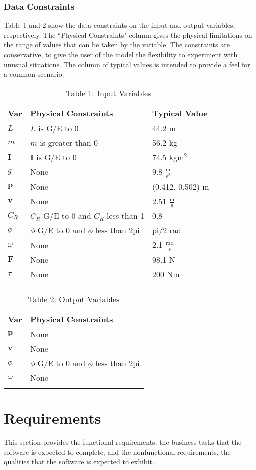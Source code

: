 \documentclass[12pt]{article}
\begin{document}
\subsubsection{Data Constraints}
\label{Sec:DC}
Table 1 and 2 show the data constraints on the input and output variables, respectively. The ``Physical Constraints" column gives the physical limitations on the range of values that can be taken by the variable. The constraints are conservative, to give the user of the model the flexibility to experiment with unusual situations. The column of typical values is intended to provide a feel for a common scenario.
\begin{longtable}{l l l}
\toprule
Var & Physical Constraints & Typical Value
\\
\midrule
$L$ & $L$ is G/E to 0 & 44.2 m
\\
$m$ & $m$ is greater than 0 & 56.2 kg
\\
$\mathbf{I}$ & $\mathbf{I}$ is G/E to 0 & 74.5 kg$\text{m}^{2}$
\\
$g$ & None & 9.8 $\frac{\text{m}}{\text{s}^{2}}$
\\
$\mathbf{p}$ & None & (0.412, 0.502) m
\\
$\mathbf{v}$ & None & 2.51 $\frac{\text{m}}{\text{s}}$
\\
$C_{R}$ & $C_{R}$ G/E to 0 and $C_{R}$ less than 1 & 0.8
\\
$\phi{}$ & $\phi{}$ G/E to 0 and $\phi{}$ less than 2pi & pi/2 rad
\\
$\omega{}$ & None & 2.1 $\frac{\text{rad}}{\text{s}}$
\\
$\mathbf{F}$ & None & 98.1 N
\\
$\tau{}$ & None & 200 Nm
\\
\bottomrule
\caption{Table 1: Input Variables}
\label{Table:T1IV}
\end{longtable}
\begin{longtable}{l l}
\toprule
Var & Physical Constraints
\\
\midrule
$\mathbf{p}$ & None
\\
$\mathbf{v}$ & None
\\
$\phi{}$ & $\phi{}$ G/E to 0 and $\phi{}$ less than 2pi
\\
$\omega{}$ & None
\\
\bottomrule
\caption{Table 2: Output Variables}
\label{Table:T2OV}
\end{longtable}
\section{Requirements}
\label{Sec:Rs}
This section provides the functional requirements, the business tasks that the software is expected to complete, and the nonfunctional requirements, the qualities that the software is expected to exhibit.
\end{document}
